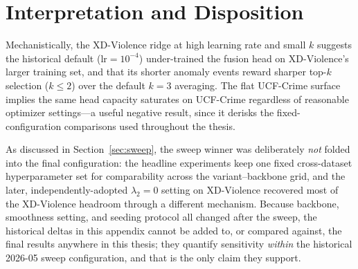 \section{Interpretation and Disposition}
\label{sec:appc-disposition}

Mechanistically, the XD-Violence ridge at high learning rate and small $k$
suggests the historical default ($\mathrm{lr}=10^{-4}$) under-trained the
fusion head on XD-Violence's larger training set, and that its shorter
anomaly events reward sharper top-$k$ selection ($k \le 2$) over the
default $k=3$ averaging. The flat UCF-Crime surface implies the same head
capacity saturates on UCF-Crime regardless of reasonable optimizer
settings---a useful negative result, since it derisks the
fixed-configuration comparisons used throughout the thesis.

As discussed in Section~\ref{sec:sweep}, the sweep winner was deliberately
\emph{not} folded into the final configuration: the headline experiments
keep one fixed cross-dataset hyperparameter set for comparability across
the variant--backbone grid, and the later, independently-adopted
$\lambda_2{=}0$ setting on XD-Violence recovered most of the XD-Violence
headroom through a different mechanism. Because backbone, smoothness
setting, and seeding protocol all changed after the sweep, the historical
deltas in this appendix cannot be added to, or compared against, the final
results anywhere in this thesis; they quantify sensitivity \emph{within}
the historical 2026-05 sweep configuration, and that is the only claim they
support.
